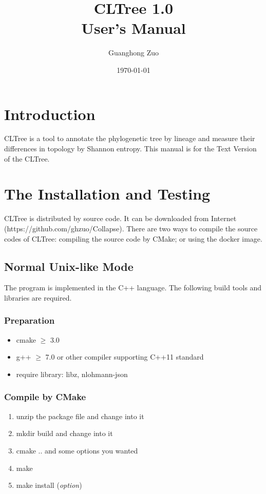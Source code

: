 \documentclass[12pt,a4paper]{article}
\begin{document}
\title{CLTree 1.0 \\ User's Manual}
\author{Guanghong Zuo}
\date{\today}
\maketitle


\section{Introduction}
CLTree is a tool to annotate the phylogenetic tree by lineage and measure their differences in topology by Shannon entropy. This manual is for the Text Version of the CLTree.

\section{The Installation and Testing}

CLTree is distributed by source code. It can be downloaded from Internet (https://github.com/ghzuo/Collapse). There are two ways to compile the source codes of CLTree: compiling the source code by CMake; or using the docker image.

\subsection{Normal Unix-like Mode}

The program is implemented in the C++ language. The following build tools and libraries are required.

\subsubsection{Preparation} 
\begin{itemize}
	\item cmake $\geq$ 3.0
	\item g++ $\geq$ 7.0 or other compiler supporting C++11 standard
	\item require library: libz, nlohmann-json
	\end{itemize}

\subsubsection{Compile by CMake} 
\begin{enumerate}
	\item unzip the package file and change into it
	\item mkdir build and change into it
	\item cmake .. and some options you wanted
	\item make  
	\item make install ({\it option})
\end{enumerate}
\end{document}
